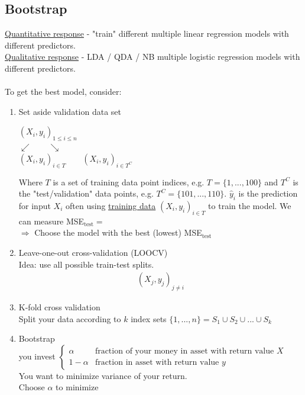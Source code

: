 \documentclass[12pt, letterpaper]{article}
\begin{document}
\subsection{Bootstrap}
\underline{Quantitative response} - "train" different multiple linear regression models
with different predictors. \\ 
\underline{Qualitative response} - LDA / QDA / NB multiple logistic regression models 
with different predictors. \\ \\
To get the best model, consider:
\begin{enumerate}
    \item Set aside validation data set
    \begin{center}
        $(X_i, y_i)_{1\le i \le n}$ \\
        $\swarrow \qquad \searrow$ \\
        $(X_i,y_i)_{i\in T} \qquad (X_i,y_i)_{i \in T^C}$
    \end{center}
    Where $T$ is a set of training data point indices, e.g. $T=\{1,...,100\}$ and 
    $T^C$ is the "test/validation" data points, e.g. $T^C=\{101,...,110\}$. 
    $\hat y_i$ is the prediction for input $X_i$ often using \underline{training data} 
    $(X_i,y_i)_{i \in T}$ to train the model. We can 
    measure MSE$_{\text{test}} = $ \\
    $\Rightarrow$ Choose the model with the best (lowest) MSE$_\text{test}$
    \item Leave-one-out cross-validation (LOOCV)\\
    Idea: use all possible train-test splits.
    \begin{align*}
        (X_j,y_j)_{j\ne i}
    \end{align*}
    \item K-fold cross validation \\
    Split your data according to $k$ index sets $\{1,...,n\} = S_1 \cup S_2 \cup ... \cup S_k$
    \item Bootstrap \\
     you invest $\begin{cases}
        \alpha & \text{fraction of your money in asset with return value }X \\
        1- \alpha & \text{fraction in asset with return value } y
    \end{cases}$ \\
    You want to minimize variance of your return. \\
    Choose $\alpha$ to minimize 

\end{enumerate}
\end{document}
